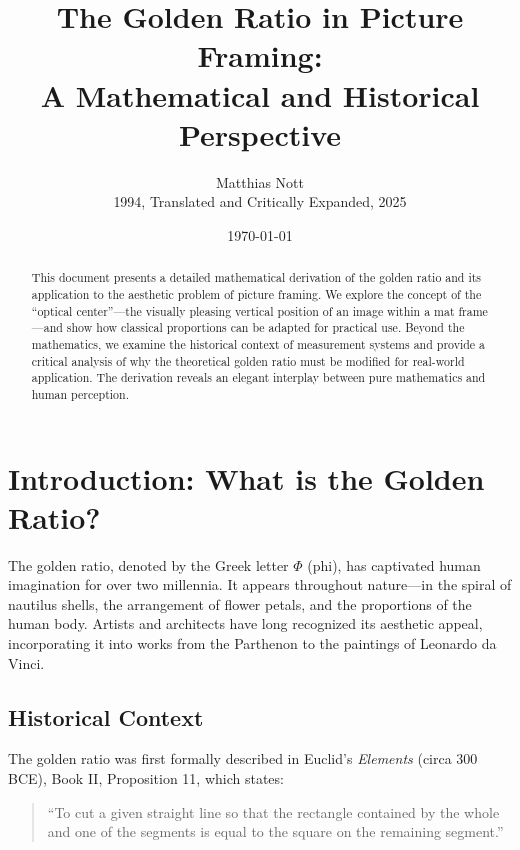 \documentclass[12pt,a4paper]{article}
\begin{document}
\title{The Golden Ratio in Picture Framing:\\
\large A Mathematical and Historical Perspective}
\author{Matthias Nott\\
\small 1994, Translated and Critically Expanded, 2025}
\date{\today}
\maketitle

\begin{abstract}
This document presents a detailed mathematical derivation of the golden ratio and its application to the aesthetic problem of picture framing. We explore the concept of the ``optical center''---the visually pleasing vertical position of an image within a mat frame---and show how classical proportions can be adapted for practical use. Beyond the mathematics, we examine the historical context of measurement systems and provide a critical analysis of why the theoretical golden ratio must be modified for real-world application. The derivation reveals an elegant interplay between pure mathematics and human perception.
\end{abstract}

\section{Introduction: What is the Golden Ratio?}

The golden ratio, denoted by the Greek letter $\Phi$ (phi), has captivated human imagination for over two millennia. It appears throughout nature---in the spiral of nautilus shells, the arrangement of flower petals, and the proportions of the human body. Artists and architects have long recognized its aesthetic appeal, incorporating it into works from the Parthenon to the paintings of Leonardo da Vinci.

\subsection{Historical Context}

The golden ratio was first formally described in Euclid's \textit{Elements} (circa 300 BCE), Book II, Proposition 11, which states:

\begin{quote}
``To cut a given straight line so that the rectangle contained by the whole and one of the segments is equal to the square on the remaining segment.''
\end{quote}
\end{document}
